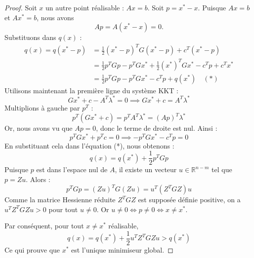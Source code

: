 \begin{proof}
    Soit $x$ un autre point réalisable : $Ax = b$.
    Soit $p = x^* - x$.
    Puisque $Ax = b$ et $Ax^* = b$, nous avons
    \begin{equation}
        Ap = A(x^* - x) = 0.
    \end{equation}
    Substituons dans $q(x)$ :
    \begin{align*}
        q(x) = q(x^* - p) &= \frac{1}{2} (x^* - p)^T G (x^* - p) + c^T (x^* - p) \\
                          &= \frac{1}{2} p^T G p - p^T G x^* + \frac{1}{2} (x^*)^T G x^* - c^T p + c^T x^* \\
                          &= \frac{1}{2} p^T G p - p^T G x^* - c^T p + q(x^*) \quad (*)
    \end{align*}
    Utilisons maintenant la première ligne du système KKT :
    \begin{equation}
        G x^* + c - A^T \lambda^* = 0 \implies G x^* + c = A^T \lambda^*
    \end{equation}
    Multiplions à gauche par $p^T$ :
    \begin{equation}
        p^T (G x^* + c) = p^T A^T \lambda^* = (Ap)^T \lambda^*
    \end{equation}
    Or, nous avons vu que $Ap = 0$, donc le terme de droite est nul. Ainsi :
    \begin{equation}
        p^T G x^* + p^T c = 0 \implies -p^T G x^* - c^T p = 0
    \end{equation}
    En substituant cela dans l'équation (*), nous obtenons :
    \begin{equation}
        q(x) = q(x^*) + \frac{1}{2} p^T G p
    \end{equation}
    Puisque $p$ est dans l'espace nul de $A$, il existe un vecteur $u \in \mathbb{R}^{n-m}$ tel que $p = Zu$. Alors :
    \begin{equation}
        p^T G p = (Zu)^T G (Zu) = u^T (Z^T G Z) u
    \end{equation}
    Comme la matrice Hessienne réduite $Z^T G Z$ est supposée définie positive, on a $u^T Z^T G Z u > 0$ pour tout $u \neq 0$.
    Or $u \neq 0 \iff p \neq 0 \iff x \neq x^*$.
    
    Par conséquent, pour tout $x \neq x^*$ réalisable,
    \begin{equation}
        q(x) = q(x^*) + \frac{1}{2} u^T Z^T G Z u > q(x^*)
    \end{equation}
    Ce qui prouve que $x^*$ est l'unique minimiseur global.
\end{proof}

